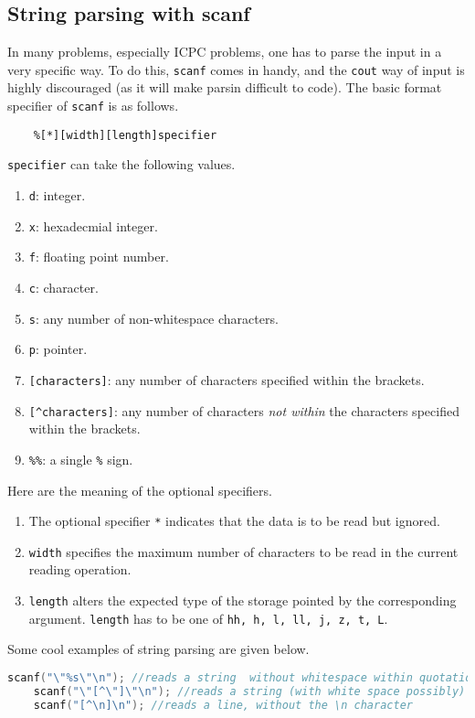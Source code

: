 \documentclass[12pt,a4paper]{amsart}
\numberwithin{equation}{section}
\theoremstyle{definition}
\begin{document}
\subsection{String parsing with scanf} In many problems, especially ICPC problems, one has to parse the input in a very specific way. To do this, \verb|scanf| comes in handy, and the \verb|cout| way of input is highly discouraged (as it will make parsin difficult to code). The basic format specifier of \verb|scanf| is as follows. 
\begin{verbatim}
    %[*][width][length]specifier
\end{verbatim}
\verb|specifier| can take the following values. 
\begin{enumerate}
    \item \verb|d|: integer.
    \item \verb|x|: hexadecmial integer.
    \item \verb|f|: floating point number.
    \item \verb|c|: character.
    \item \verb|s|: any number of non-whitespace characters.
    \item \verb|p|: pointer.
    \item \verb|[characters]|: any number of characters specified within the brackets.
    \item \verb|[^characters]|: any number of characters \textit{not within} the characters specified within the brackets.
    \item \verb|%%|: a single \verb|%| sign. 
\end{enumerate}
Here are the meaning of the optional specifiers. 
\begin{enumerate}
    \item The optional specifier \verb|*| indicates that the data is to be read but ignored.
    \item \verb|width| specifies the maximum number of characters to be read in the current reading operation.
    \item \verb|length| alters the expected type of the storage pointed by the corresponding argument. \verb|length| has to be one of \verb|hh, h, l, ll, j, z, t, L|. 
\end{enumerate}
Some cool examples of string parsing are given below. 
\begin{lstlisting}[language=C++]
    scanf("\"%s\"\n"); //reads a string  without whitespace within quotation marks
    scanf("\"[^\"]\"\n"); //reads a string (with white space possibly) without the " character within quotation marks
    scanf("[^\n]\n"); //reads a line, without the \n character
\end{lstlisting}
\end{document}
